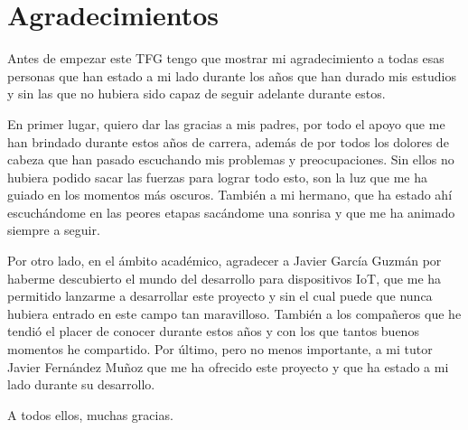 \newpage %
\thispagestyle{empty}
\mbox{}

\chapter*{Agradecimientos}
\setcounter{page}{7}
Antes de empezar este TFG tengo que mostrar mi agradecimiento a todas esas personas que han estado a mi lado durante los años que han durado mis estudios y sin las que no hubiera sido capaz de seguir adelante durante estos.

En primer lugar, quiero dar las gracias a mis padres, por todo el apoyo que me han brindado durante estos años de carrera, además de por todos los dolores de cabeza que han pasado escuchando mis problemas y preocupaciones. Sin ellos no hubiera podido sacar las fuerzas para lograr todo esto, son la luz que me ha guiado en los momentos más oscuros. También a mi hermano, que ha estado ahí escuchándome en las peores etapas sacándome una sonrisa y que me ha animado siempre a seguir.

Por otro lado, en el ámbito académico, agradecer a Javier García Guzmán por haberme descubierto el mundo del desarrollo para dispositivos IoT, que me ha permitido lanzarme a desarrollar este proyecto y sin el cual puede que nunca hubiera entrado en este campo tan maravilloso. También a los compañeros que he tendió el placer de conocer durante estos años y con los que tantos buenos momentos he compartido. Por último, pero no menos importante, a mi tutor Javier Fernández Muñoz que me ha ofrecido este proyecto y que ha estado a mi lado durante su desarrollo.

A todos ellos, muchas gracias.